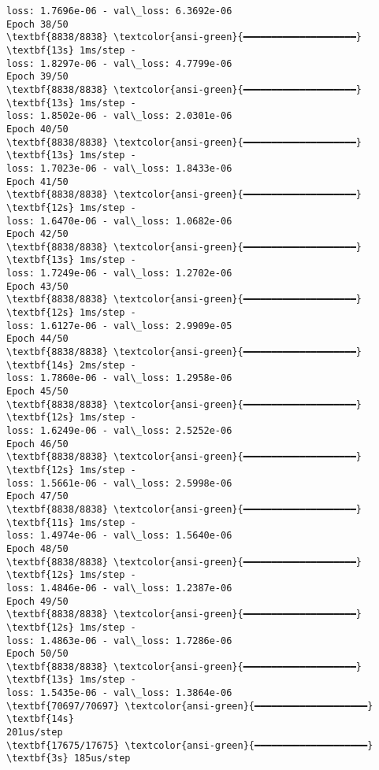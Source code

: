\documentclass[11pt]{article}
\makeatletter
\newcommand{\boxspacing}{\kern\kvtcb@left@rule\kern\kvtcb@boxsep}
\newcommand{\prompt}[4]{
        {\ttfamily\llap{{\color{#2}[#3]:\hspace{3pt}#4}}\vspace{-\baselineskip}}
    }
\makeatother
\begin{document}
\begin{Verbatim}[commandchars=\\\{\}]
loss: 1.7696e-06 - val\_loss: 6.3692e-06
Epoch 38/50
\textbf{8838/8838} \textcolor{ansi-green}{━━━━━━━━━━━━━━━━━━━━} \textbf{13s} 1ms/step -
loss: 1.8297e-06 - val\_loss: 4.7799e-06
Epoch 39/50
\textbf{8838/8838} \textcolor{ansi-green}{━━━━━━━━━━━━━━━━━━━━} \textbf{13s} 1ms/step -
loss: 1.8502e-06 - val\_loss: 2.0301e-06
Epoch 40/50
\textbf{8838/8838} \textcolor{ansi-green}{━━━━━━━━━━━━━━━━━━━━} \textbf{13s} 1ms/step -
loss: 1.7023e-06 - val\_loss: 1.8433e-06
Epoch 41/50
\textbf{8838/8838} \textcolor{ansi-green}{━━━━━━━━━━━━━━━━━━━━} \textbf{12s} 1ms/step -
loss: 1.6470e-06 - val\_loss: 1.0682e-06
Epoch 42/50
\textbf{8838/8838} \textcolor{ansi-green}{━━━━━━━━━━━━━━━━━━━━} \textbf{13s} 1ms/step -
loss: 1.7249e-06 - val\_loss: 1.2702e-06
Epoch 43/50
\textbf{8838/8838} \textcolor{ansi-green}{━━━━━━━━━━━━━━━━━━━━} \textbf{12s} 1ms/step -
loss: 1.6127e-06 - val\_loss: 2.9909e-05
Epoch 44/50
\textbf{8838/8838} \textcolor{ansi-green}{━━━━━━━━━━━━━━━━━━━━} \textbf{14s} 2ms/step -
loss: 1.7860e-06 - val\_loss: 1.2958e-06
Epoch 45/50
\textbf{8838/8838} \textcolor{ansi-green}{━━━━━━━━━━━━━━━━━━━━} \textbf{12s} 1ms/step -
loss: 1.6249e-06 - val\_loss: 2.5252e-06
Epoch 46/50
\textbf{8838/8838} \textcolor{ansi-green}{━━━━━━━━━━━━━━━━━━━━} \textbf{12s} 1ms/step -
loss: 1.5661e-06 - val\_loss: 2.5998e-06
Epoch 47/50
\textbf{8838/8838} \textcolor{ansi-green}{━━━━━━━━━━━━━━━━━━━━} \textbf{11s} 1ms/step -
loss: 1.4974e-06 - val\_loss: 1.5640e-06
Epoch 48/50
\textbf{8838/8838} \textcolor{ansi-green}{━━━━━━━━━━━━━━━━━━━━} \textbf{12s} 1ms/step -
loss: 1.4846e-06 - val\_loss: 1.2387e-06
Epoch 49/50
\textbf{8838/8838} \textcolor{ansi-green}{━━━━━━━━━━━━━━━━━━━━} \textbf{12s} 1ms/step -
loss: 1.4863e-06 - val\_loss: 1.7286e-06
Epoch 50/50
\textbf{8838/8838} \textcolor{ansi-green}{━━━━━━━━━━━━━━━━━━━━} \textbf{13s} 1ms/step -
loss: 1.5435e-06 - val\_loss: 1.3864e-06
\textbf{70697/70697} \textcolor{ansi-green}{━━━━━━━━━━━━━━━━━━━━} \textbf{14s}
201us/step
\textbf{17675/17675} \textcolor{ansi-green}{━━━━━━━━━━━━━━━━━━━━} \textbf{3s} 185us/step
    \end{Verbatim}

    \begin{tcolorbox}[breakable, size=fbox, boxrule=1pt, pad at break*=1mm,colback=cellbackground, colframe=cellborder]
\prompt{In}{incolor}{ }{\boxspacing}
\begin{Verbatim}[commandchars=\\\{\}]

\end{Verbatim}
\end{tcolorbox}
\end{document}
